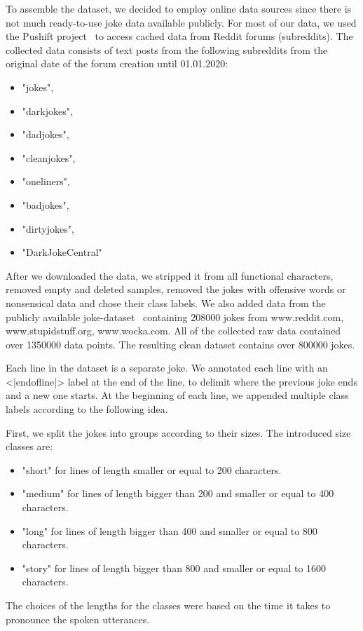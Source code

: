 To assemble the dataset, we decided to employ online data sources since there is not much ready-to-use joke data available publicly. For most of our data, we used the Pushift project~\parencite{baumgartner2020pushshift} to access cached data from Reddit forums (subreddits). The collected data consists of text posts from the following subreddits from the original date of the forum creation until 01.01.2020:
\begin{itemize}
    \item "jokes",
    \item "darkjokes",
    \item "dadjokes",
    \item "cleanjokes",
    \item "oneliners",
    \item "badjokes",
    \item "dirtyjokes",
    \item "DarkJokeCentral"
\end{itemize}
After we downloaded the data, we stripped it from all functional characters, removed empty and deleted samples, removed the jokes with offensive words or nonsensical data and chose their class labels. We also added data from the publicly available joke-dataset~\parencite{pungas} containing 208000 jokes from www.reddit.com, www.stupidstuff.org, www.wocka.com. All of the collected raw data contained over 1350000 data points. The resulting clean dataset contains over 800000 jokes.

Each line in the dataset is a separate joke. We annotated each line with an <|endofline|> label at the end of the line, to delimit where the previous joke ends and a new one starts. At the beginning of each line, we appended multiple class labels according to the following idea.

First, we split the jokes into groups according to their sizes. The introduced size classes are: 
\begin{itemize}
    \item "short" for lines of length smaller or equal to 200 characters.
    \item "medium" for lines of length bigger than 200 and smaller or equal to 400 characters.
    \item "long" for lines of length bigger than 400 and smaller or equal to 800 characters.
    \item "story" for lines of length bigger than 800 and smaller or equal to 1600 characters.
\end{itemize}
The choices of the lengths for the classes were based on the time it takes to pronounce the spoken utterances.

